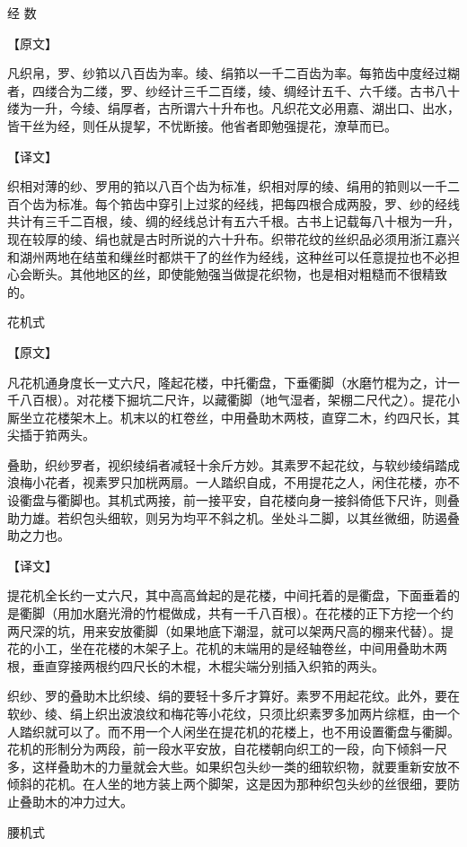 \documentclass[12pt,UTF8]{ctexbook}
\begin{document}
经 数

【原文】

凡织帛，罗、纱筘以八百齿为率。绫、绢筘以一千二百齿为率。每筘齿中度经过糊者，四缕合为二缕，罗、纱经计三千二百缕，绫、绸经计五千、六千缕。古书八十缕为一升，今绫、绢厚者，古所谓六十升布也。凡织花文必用嘉、湖出口、出水，皆干丝为经，则任从提挈，不忧断接。他省者即勉强提花，潦草而已。

【译文】

织相对薄的纱、罗用的筘以八百个齿为标准，织相对厚的绫、绢用的筘则以一千二百个齿为标准。每个筘齿中穿引上过浆的经线，把每四根合成两股，罗、纱的经线共计有三千二百根，绫、绸的经线总计有五六千根。古书上记载每八十根为一升，现在较厚的绫、绢也就是古时所说的六十升布。织带花纹的丝织品必须用浙江嘉兴和湖州两地在结茧和缫丝时都烘干了的丝作为经线，这种丝可以任意提拉也不必担心会断头。其他地区的丝，即使能勉强当做提花织物，也是相对粗糙而不很精致的。

花机式

【原文】

凡花机通身度长一丈六尺，隆起花楼，中托衢盘，下垂衢脚（水磨竹棍为之，计一千八百根）。对花楼下掘坑二尺许，以藏衢脚（地气湿者，架棚二尺代之）。提花小厮坐立花楼架木上。机末以的杠卷丝，中用叠助木两枝，直穿二木，约四尺长，其尖插于筘两头。

叠助，织纱罗者，视织绫绢者减轻十余斤方妙。其素罗不起花纹，与软纱绫绢踏成浪梅小花者，视素罗只加桄两扇。一人踏织自成，不用提花之人，闲住花楼，亦不设衢盘与衢脚也。其机式两接，前一接平安，自花楼向身一接斜倚低下尺许，则叠助力雄。若织包头细软，则另为均平不斜之机。坐处斗二脚，以其丝微细，防遏叠助之力也。

【译文】

提花机全长约一丈六尺，其中高高耸起的是花楼，中间托着的是衢盘，下面垂着的是衢脚（用加水磨光滑的竹棍做成，共有一千八百根）。在花楼的正下方挖一个约两尺深的坑，用来安放衢脚（如果地底下潮湿，就可以架两尺高的棚来代替）。提花的小工，坐在花楼的木架子上。花机的末端用的是经轴卷丝，中间用叠助木两根，垂直穿接两根约四尺长的木棍，木棍尖端分别插入织筘的两头。

织纱、罗的叠助木比织绫、绢的要轻十多斤才算好。素罗不用起花纹。此外，要在软纱、绫、绢上织出波浪纹和梅花等小花纹，只须比织素罗多加两片综框，由一个人踏织就可以了。而不用一个人闲坐在提花机的花楼上，也不用设置衢盘与衢脚。花机的形制分为两段，前一段水平安放，自花楼朝向织工的一段，向下倾斜一尺多，这样叠助木的力量就会大些。如果织包头纱一类的细软织物，就要重新安放不倾斜的花机。在人坐的地方装上两个脚架，这是因为那种织包头纱的丝很细，要防止叠助木的冲力过大。

腰机式
\end{document}
